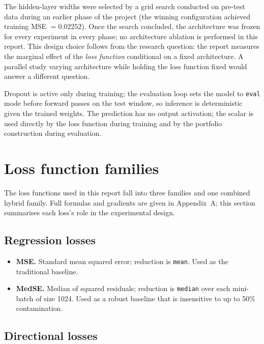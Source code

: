 The hidden-layer widths were selected by a grid search conducted on pre-test data during an earlier phase of the project (the winning configuration achieved training MSE $= 0.02252$). Once the search concluded, the architecture was frozen for every experiment in every phase; no architecture ablation is performed in this report. This design choice follows from the research question: the report measures the marginal effect of the \emph{loss function} conditional on a fixed architecture. A parallel study varying architecture while holding the loss function fixed would answer a different question.

Dropout is active only during training; the evaluation loop sets the model to \texttt{eval} mode before forward passes on the test window, so inference is deterministic given the trained weights. The prediction has no output activation; the scalar is used directly by the loss function during training and by the portfolio construction during evaluation.

\section{Loss function families}

\label{sec:loss-function-families}

The loss functions used in this report fall into three families and one combined hybrid family. Full formulas and gradients are given in Appendix~A; this section summarises each loss's role in the experimental design.

\subsection{Regression losses}

\label{subsec:regression-losses}

\begin{itemize}
 \item \textbf{MSE.} Standard mean squared error; reduction is \texttt{mean}. Used as the traditional baseline.
 \item \textbf{MedSE.} Median of squared residuals; reduction is \texttt{median} over each mini-batch of size 1024. Used as a robust baseline that is insensitive to up to 50\% contamination.
\end{itemize}

\subsection{Directional losses}

